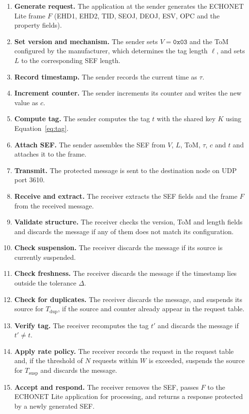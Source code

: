 \begin{enumerate}
  \item \textbf{Generate request.} The application at the sender generates the ECHONET Lite frame $F$ (EHD1, EHD2, TID, SEOJ, DEOJ, ESV, OPC and the property fields).
  \item \textbf{Set version and mechanism.} The sender sets $V = \texttt{0x03}$ and the ToM configured by the manufacturer, which determines the tag length $\ell$, and sets $L$ to the corresponding SEF length.
  \item \textbf{Record timestamp.} The sender records the current time as $\tau$.
  \item \textbf{Increment counter.} The sender increments its counter and writes the new value as $c$.
  \item \textbf{Compute tag.} The sender computes the tag $t$ with the shared key $K$ using Equation~\ref{eq:tag}.
  \item \textbf{Attach SEF.} The sender assembles the SEF from $V$, $L$, ToM, $\tau$, $c$ and $t$ and attaches it to the frame.
  \item \textbf{Transmit.} The protected message is sent to the destination node on UDP port 3610.
  \item \textbf{Receive and extract.} The receiver extracts the SEF fields and the frame $F$ from the received message.
  \item \textbf{Validate structure.} The receiver checks the version, ToM and length fields and discards the message if any of them does not match its configuration.
  \item \textbf{Check suspension.} The receiver discards the message if its source is currently suspended.
  \item \textbf{Check freshness.} The receiver discards the message if the timestamp lies outside the tolerance $\Delta$.
  \item \textbf{Check for duplicates.} The receiver discards the message, and suspends its source for $T_{\mathrm{dup}}$, if the source and counter already appear in the request table.
  \item \textbf{Verify tag.} The receiver recomputes the tag $t'$ and discards the message if $t' \neq t$.
  \item \textbf{Apply rate policy.} The receiver records the request in the request table and, if the threshold of $N$ requests within $W$ is exceeded, suspends the source for $T_{\mathrm{susp}}$ and discards the message.
  \item \textbf{Accept and respond.} The receiver removes the SEF, passes $F$ to the ECHONET Lite application for processing, and returns a response protected by a newly generated SEF.
\end{enumerate}


